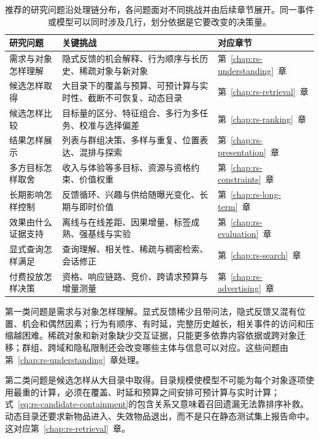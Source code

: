 \begin{table}[htbp]
  \centering
  \begin{tabularx}{\linewidth}{@{}lXl@{}}
    \toprule
    研究问题 & 关键挑战 & 对应章节 \\
    \midrule
    需求与对象怎样理解 & 隐式反馈的机会解释、行为顺序与长历史、稀疏对象与新对象 & 第~\ref{chap:rs-understanding}~章 \\
    候选怎样取得 & 大目录下的覆盖与预算、可预计算与实时性、截断不可恢复、动态目录 & 第~\ref{chap:rs-retrieval}~章 \\
    候选怎样比较 & 目标量的区分、特征组合、多行为多任务、校准与选择偏差 & 第~\ref{chap:rs-ranking}~章 \\
    结果怎样展示 & 列表与群组决策、多样与重复、位置表达、混排与探索 & 第~\ref{chap:rs-presentation}~章 \\
    多方目标怎样取舍 & 收入与体验等多目标、资源与资格约束、价值权重 & 第~\ref{chap:rs-constraints}~章 \\
    长期影响怎样控制 & 反馈循环、兴趣与供给随曝光变化、长期与即时价值 & 第~\ref{chap:rs-long-term}~章 \\
    效果由什么证据支持 & 离线与在线差距、因果增量、标签成熟、强基线与实验 & 第~\ref{chap:rs-evaluation}~章 \\
    显式查询怎样满足 & 查询理解、相关性、稀疏与稠密检索、会话修正 & 第~\ref{chap:rs-search}~章 \\
    付费投放怎样决策 & 资格、响应链路、竞价、跨请求预算与增量测量 & 第~\ref{chap:rs-advertising}~章 \\
    \bottomrule
  \end{tabularx}
  \caption{推荐的研究问题沿处理链分布，各问题面对不同挑战并由后续章节展开。同一事件或模型可以同时涉及几行，划分依据是它要改变的决策量。}
  \label{tab:rs-research-map}
\end{table}

第一类问题是需求与对象怎样理解。显式反馈稀少且带问法，隐式反馈又混有位置、机会和偶然因素；行为有顺序、有时延，完整历史越长，相关事件的访问和压缩越困难。稀疏对象和新对象缺少交互证据，只能更多依靠内容依据或跨对象迁移；群组、跨域和隐私限制还会改变哪些主体与信息可以对应。这些问题由第~\ref{chap:rs-understanding}~章处理。

第二类问题是候选怎样从大目录中取得。目录规模使模型不可能为每个对象逐项使用最重的计算，必须在覆盖、时延和预算之间安排可预计算与实时计算；式~\eqref{eq:rs-candidate-containment}的包含关系又意味着召回遗漏无法靠排序补救。动态目录还要求新物品进入、失效物品退出，而不是只在静态测试集上报告命中。这对应第~\ref{chap:rs-retrieval}~章。

